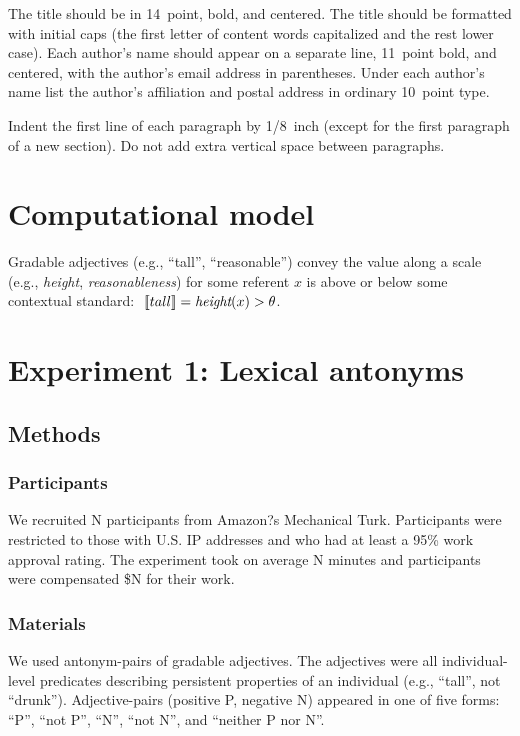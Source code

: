 \documentclass[10pt,letterpaper]{article}
\newcommand{\denote}[1]{\mbox{ $[\![ #1 ]\!]$}}
\begin{document}
The title should be in 14~point, bold, and centered. The title should
be formatted with initial caps (the first letter of content words
capitalized and the rest lower case). Each author's name should appear
on a separate line, 11~point bold, and centered, with the author's
email address in parentheses. Under each author's name list the
author's affiliation and postal address in ordinary 10~point type.

Indent the first line of each paragraph by 1/8~inch (except for the
first paragraph of a new section). Do not add extra vertical space
between paragraphs.


\section{Computational model}

Gradable adjectives (e.g., ``tall'', ``reasonable'') convey the value along a scale (e.g., \emph{height}, \emph{reasonableness}) for some referent $x$ is above or below some contextual standard: $\denote{tall} = \emph{height}(x) > \theta$.

\section{Experiment 1: Lexical antonyms}
\subsection{Methods}
\subsubsection{Participants}

We recruited N participants from Amazon?s Mechanical Turk. Participants were restricted to those with U.S. IP addresses and who had at least a 95\% work approval rating. The experiment took on average N minutes and participants were compensated \$N for their work.

\subsubsection{Materials}

We used antonym-pairs of gradable adjectives.
The adjectives were all individual-level predicates describing persistent properties of an individual (e.g., ``tall'', not ``drunk''). 
Adjective-pairs (positive P, negative N) appeared in one of five forms: ``P'', ``not P'', ``N'', ``not N'', and ``neither P nor N''. 
\end{document}
